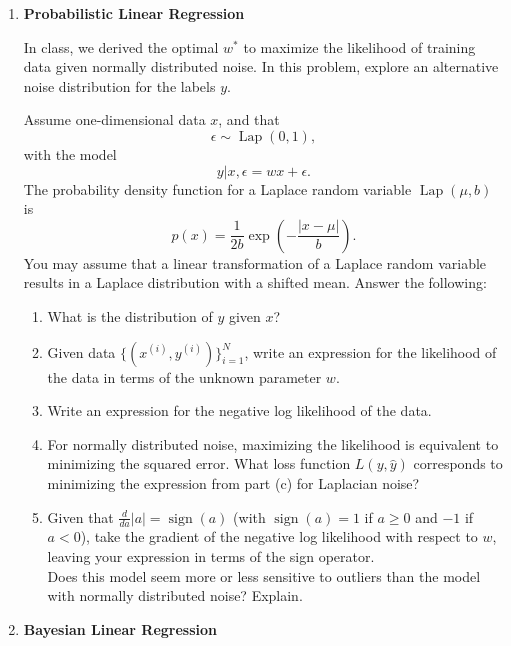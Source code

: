 \documentclass{article}
\begin{document}
\begin{enumerate}[label=\textbf{\arabic*.}]
    \item \textbf{Probabilistic Linear Regression}

    In class, we derived the optimal $w^*$ to maximize the likelihood of training data given normally distributed noise. In this problem, explore an alternative noise distribution for the labels $y$.

    Assume one-dimensional data $x$, and that
    \[
    \epsilon \sim \operatorname{Lap}(0,1),
    \]
    with the model
    \[
    y|x,\epsilon = wx+\epsilon.
    \]
    The probability density function for a Laplace random variable $\operatorname{Lap}(\mu,b)$ is
    \[
    p(x)=\frac{1}{2b}\exp\left(-\frac{|x-\mu|}{b}\right).
    \]
    You may assume that a linear transformation of a Laplace random variable results in a Laplace distribution with a shifted mean. Answer the following:
    \begin{enumerate}[label=(\alph*)]
        \item What is the distribution of $y$ given $x$?
        \item Given data $\{(x^{(i)},y^{(i)})\}_{i=1}^N$, write an expression for the likelihood of the data in terms of the unknown parameter $w$.
        \item Write an expression for the negative log likelihood of the data.
        \item For normally distributed noise, maximizing the likelihood is equivalent to minimizing the squared error. What loss function $L(y,\hat{y})$ corresponds to minimizing the expression from part (c) for Laplacian noise?
        \item Given that $\frac{d}{da}|a|=\operatorname{sign}(a)$ (with $\operatorname{sign}(a)=1$ if $a\ge0$ and $-1$ if $a<0$), take the gradient of the negative log likelihood with respect to $w$, leaving your expression in terms of the sign operator. \\
        Does this model seem more or less sensitive to outliers than the model with normally distributed noise? Explain.
    \end{enumerate}

    \item \textbf{Bayesian Linear Regression}


\end{enumerate}
\end{document}
